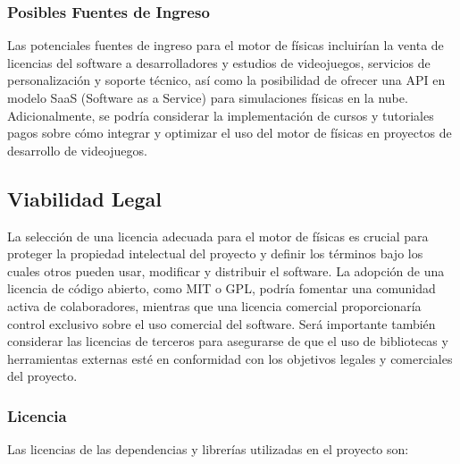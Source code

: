 \subsubsection{Posibles Fuentes de Ingreso}
Las potenciales fuentes de ingreso para el motor de físicas incluirían la venta de licencias del software a desarrolladores y estudios de videojuegos, servicios de personalización y soporte técnico, así como la posibilidad de ofrecer una API en modelo SaaS (Software as a Service) para simulaciones físicas en la nube. Adicionalmente, se podría considerar la implementación de cursos y tutoriales pagos sobre cómo integrar y optimizar el uso del motor de físicas en proyectos de desarrollo de videojuegos.

\subsection{Viabilidad Legal}
La selección de una licencia adecuada para el motor de físicas es crucial para proteger la propiedad intelectual del proyecto y definir los términos bajo los cuales otros pueden usar, modificar y distribuir el software. La adopción de una licencia de código abierto, como MIT o GPL, podría fomentar una comunidad activa de colaboradores, mientras que una licencia comercial proporcionaría control exclusivo sobre el uso comercial del software. Será importante también considerar las licencias de terceros para asegurarse de que el uso de bibliotecas y herramientas externas esté en conformidad con los objetivos legales y comerciales del proyecto.

\subsubsection{Licencia}
Las licencias de las dependencias y librerías utilizadas en el proyecto son:


